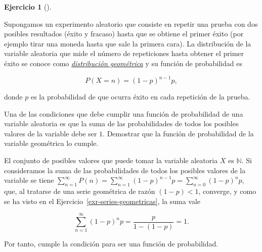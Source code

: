 \documentclass[
  spanish,
  a4paper,
]{scrreport}
\theoremstyle{definition}
\newtheorem{exercise}{Ejercicio}[chapter]
\theoremstyle{remark}
\begin{document}
\begin{exercise}[]\protect\hypertarget{exr-distribucion-hipergeometrica}{}\label{exr-distribucion-hipergeometrica}

Supongamos un experimento aleatorio que consiste en repetir una prueba
con dos posibles resultados (éxito y fracaso) hasta que se obtiene el
primer éxito (por ejemplo tirar una moneda hasta que sale la primera
cara). La distribución de la variable aleatoria que mide el número de
repeticiones hasta obtener el primer éxito se conoce como
\href{https://es.wikipedia.org/wiki/Distribuci\%C3\%B3n_geom\%C3\%A9trica}{\emph{distribución
geométrica}} y su función de probabilidad es

\[
P(X=n)=(1-p)^{n-1}p,
\]

donde \(p\) es la probabilidad de que ocurra éxito en cada repetición de
la prueba.

Una de las condiciones que debe cumplir una función de probabilidad de
una variable aleatoria es que la suma de las probabilidades de todos los
posibles valores de la variable debe ser \(1\). Demostrar que la función
de probabilidad de la variable geométrica lo cumple.

\end{exercise}

\begin{tcolorbox}[enhanced jigsaw, arc=.35mm, bottomrule=.15mm, bottomtitle=1mm, breakable, colback=white, colbacktitle=quarto-callout-tip-color!10!white, colframe=quarto-callout-tip-color-frame, coltitle=black, left=2mm, leftrule=.75mm, opacityback=0, opacitybacktitle=0.6, rightrule=.15mm, title=\textcolor{quarto-callout-tip-color}{\faLightbulb}\hspace{0.5em}{Solución}, titlerule=0mm, toprule=.15mm, toptitle=1mm]

El conjunto de posibles valores que puede tomar la variable aleatoria
\(X\) es \(\mathbb{N}\). Si consideramos la suma de las probabilidades
de todos los posibles valores de la variable se tiene
\(\sum_{n=1}^\infty P(n) = \sum_{n=1}^\infty (1-p)^{n-1}p = \sum_{n=0}^\infty (1-p)^n p\),
que, al tratarse de una serie geométrica de razón \((1-p)<1\), converge,
y como se ha visto en el Ejercicio~\ref{exr-series-geometricas}, la suma
vale

\[
\sum_{n=1}^\infty (1-p)^n p = \frac{p}{1-(1-p)}= 1.
\]

Por tanto, cumple la condición para ser una función de probabilidad.

\end{tcolorbox}
\end{document}
